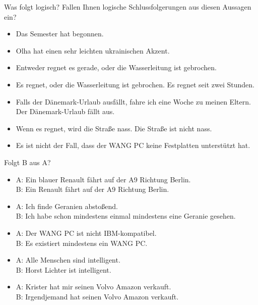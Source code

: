 \begin{frame}
  {Was folgt logisch?}
  \onslide<+->
  \onslide<+->
  Fallen Ihnen logische Schlussfolgerungen aus diesen Aussagen ein?\\
  \Halbzeile
  \begin{itemize}[<+->]
    \item Das Semester hat begonnen.
    \item Olha hat einen sehr leichten ukrainischen Akzent.
    \item Entweder regnet es gerade, oder die Wasserleitung ist gebrochen.
    \item Es regnet, oder die Wasserleitung ist gebrochen. Es regnet seit zwei Stunden.
    \item Falls der Dänemark-Urlaub ausfällt, fahre ich eine Woche zu meinen Eltern.\\
      Der Dänemark-Urlaub fällt aus.
    \item Wenn es regnet, wird die Straße nass. Die Straße ist nicht nass.
    \item Es ist nicht der Fall, dass der WANG PC keine Festplatten unterstützt hat.
  \end{itemize}
\end{frame}

\begin{frame}
  {Folgt B aus A?} %
  \onslide<+->
  \begin{itemize}[<+->]
    \item A: Ein blauer Renault fährt auf der A9 Richtung Berlin.\\
      \alert{B: Ein Renault fährt auf der A9 Richtung Berlin.}
    \item A: Ich finde Geranien abstoßend.\\
      \alert{B: Ich habe schon mindestens einmal mindestens eine Geranie gesehen.}
    \item A: Der WANG PC ist nicht IBM-kompatibel.\\
      \alert{B: Es existiert mindestens ein WANG PC.}
    \item A: Alle Menschen sind intelligent.\\
      \alert{B: Horst Lichter ist intelligent.}
    \item A: Krister hat mir seinen Volvo Amazon verkauft.\\
      \alert{B: Irgendjemand hat seinen Volvo Amazon verkauft.}
  \end{itemize}
\end{frame}

